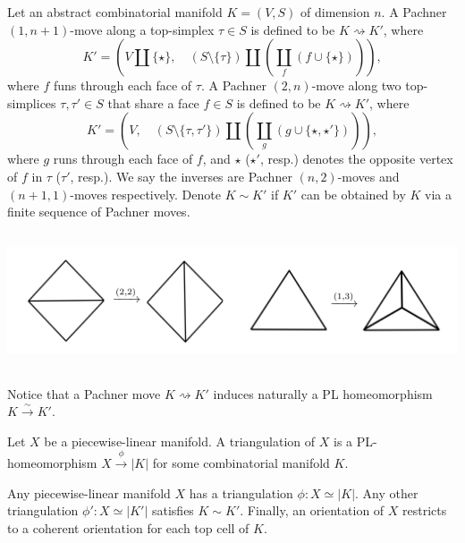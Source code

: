 \begin{definition}\label{def/pachner-move}
  Let an abstract combinatorial manifold $K = (V,S)$ of
  dimension $n$. A Pachner $(1,n+1)$-move along a top-simplex
  $\tau \in S$ is defined to be $K \rightsquigarrow K'$, where
  $$
  K' = \left(
    V \coprod \{\star\},\quad (S\setminus\{\tau\}) \coprod (\coprod_{f} (f \cup \{\star\}))
  \right),
  $$
  where $f$ funs through each face of $\tau$. A Pachner
  $(2,n)$-move along two top-simplices $\tau, \tau' \in S$ that
  share a face $f \in S$ is defined to be
  $K \rightsquigarrow K'$, where
  $$ K' = \left (V,\quad (S\setminus\{\tau,\tau'\}) \coprod (\coprod_{g} (g \cup \{\star, \star'\})) \right),$$
  where $g$ runs through each face of $f$, and $\star$ ($\star'$,
  resp.) denotes the opposite vertex of $f$ in $\tau$ ($\tau'$,
  resp.). We say the inverses are Pachner $(n,2)$-moves and
  $(n+1,1)$-moves respectively. Denote $K \sim K'$ if $K'$ can be
  obtained by $K$ via a finite sequence of Pachner moves.
  \begin{center}
    \includegraphics[height=4cm]{pachner-move}
  \end{center}
\end{definition}

\noindent Notice that a Pachner move $K \rightsquigarrow K'$
induces naturally a PL homeomorphism $K \xrightarrow{\sim} K'$.

\begin{definition} Let $X$ be a
  piecewise-linear manifold. A triangulation of $X$ is a
  PL-homeomorphism $X \xrightarrow{\phi} |K|$ for some
  combinatorial manifold $K$.
\end{definition}

\begin{fact}
  Any piecewise-linear manifold $X$ has a triangulation
  $\phi: X \simeq |K|$. Any other triangulation
  $\phi': X \simeq |K'|$ satisfies $K \sim K'$. Finally, an
  orientation of $X$ restricts to a coherent orientation for each
  top cell of $K$.
\end{fact}

